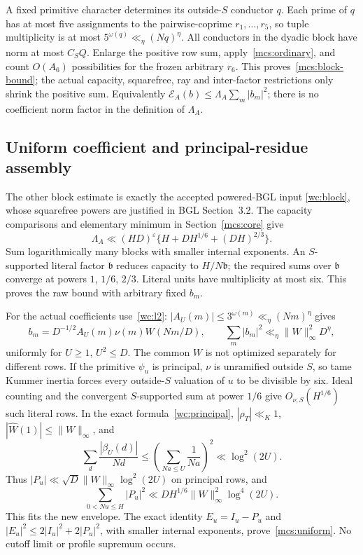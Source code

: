 \documentclass[11pt,oneside,openany]{book}
\theoremstyle{definition}\newtheorem{definition}[theorem]{Definition}
\theoremstyle{remark}\newtheorem{remark}[theorem]{Remark}
\begin{document}
A fixed primitive character determines its outside-$S$ conductor $q$.
Each prime of $q$ has at most five assignments to the pairwise-coprime
$r_1,\ldots,r_5$, so tuple multiplicity is at most
$5^{\omega(q)}\ll_\eta(Nq)^\eta$.
All conductors in the dyadic block have norm at most $C_SQ$.
Enlarge the positive row sum, apply~\eqref{mcs:ordinary}, and count
$O(A_6)$ possibilities for the frozen arbitrary $r_6$.
This proves~\eqref{mcs:block-bound}; the actual capacity, squarefree,
ray and inter-factor restrictions only shrink the positive sum.
Equivalently $\mathcal E_A(b)\le\Lambda_A\sum_m|b_m|^2$;
there is no coefficient norm factor in the definition of $\Lambda_A$.

\subsection{Uniform coefficient and principal-residue assembly}
The other block estimate is exactly the accepted powered-BGL input
\eqref{wc:block}, whose squarefree powers are justified in BGL
Section~3.2. The capacity comparisons and elementary minimum in
Section~\ref{mcs:core} give
\[
 \Lambda_A\ll(HD)^\varepsilon
          \{H+DH^{1/6}+(DH)^{2/3}\}.
\]
Sum logarithmically many blocks with smaller internal exponents.
An $S$-supported literal factor $\mathfrak b$ reduces capacity to
$H/N\mathfrak b$; the required sums over $\mathfrak b$ converge
at powers $1$, $1/6$, $2/3$. Literal units have multiplicity at most six.
This proves the raw bound with arbitrary fixed $b_m$.

For the actual coefficients use~\eqref{wc:l2}:
$|A_U(m)|\le3^{\omega(m)}\ll_\eta(Nm)^\eta$ gives
\[
 b_m=D^{-1/2}A_U(m)\nu(m)W(Nm/D),\qquad
       \sum_m|b_m|^2\ll_\eta\|W\|_\infty^2D^\eta,
\]
uniformly for $U\ge1$, $U^2\le D$. The common $W$ is not optimized
separately for different rows. If the primitive $\psi_u$ is principal,
$\nu$ is unramified outside $S$, so tame Kummer inertia forces every
outside-$S$ valuation of $u$ to be divisible by six. Ideal counting and
the convergent $S$-supported sum at power $1/6$ give
$O_{\nu,S}(H^{1/6})$ such literal rows.
In the exact formula~\eqref{wc:principal}, $|\rho_T|\ll_K1$,
$|\widehat W(1)|\le\|W\|_\infty$, and
\[
 \sum_d\frac{|\beta_U(d)|}{Nd}
 \le\left(\sum_{Na\le U}\frac1{Na}\right)^2
 \ll\log^2(2U).
\]
Thus $|P_u|\ll\sqrt D\|W\|_\infty\log^2(2U)$ on principal rows,
and
\[
 \sum_{0<Nu\le H}|P_u|^2
       \ll DH^{1/6}\|W\|_\infty^2\log^4(2U).
\]
This fits the new envelope. The exact identity $E_u=I_u-P_u$ and
$|E_u|^2\le2|I_u|^2+2|P_u|^2$, with smaller internal exponents,
prove~\eqref{mcs:uniform}. No cutoff limit or profile supremum occurs.
\end{document}
